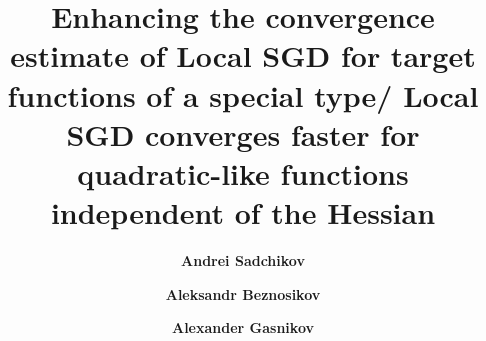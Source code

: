 
\title{\fontsize{12}{14}\selectfont \textbf{Enhancing the convergence estimate of Local SGD for target functions of a special type/ Local SGD converges faster for quadratic-like functions independent of the Hessian}}

\author[1]{\fontsize{11}{14} \textbf{Andrei Sadchikov}}
\author[1, 2]{\fontsize{11}{14} \textbf{Aleksandr Beznosikov}}
\author[1, 3]{\fontsize{11}{14} \textbf{Alexander Gasnikov}}

\date{}